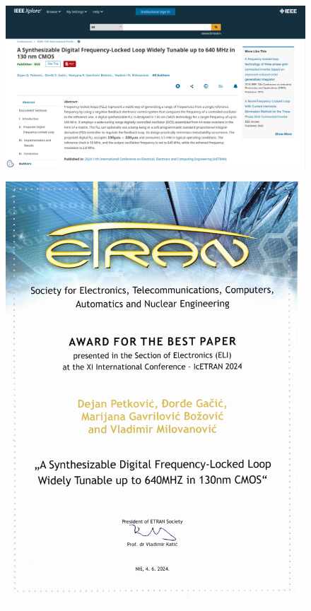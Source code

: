 \documentclass[aspectratio=169]{beamer}
\begin{document}
\begin{frame}{\secname}
	\vspace{-0.5cm}
        \begin{figure}[!t]
        	\centering
            	\includegraphics[scale=0.21]{slike/prezentacija/etran_1.png}
        \end{figure}
\end{frame}

\begin{frame}{\secname}
        \begin{figure}[!t]
        	\centering
            	\includegraphics[scale=0.28]{slike/prezentacija/IcETRAN2024_nagrada.pdf}
        \end{figure}
\end{frame}
\end{document}
